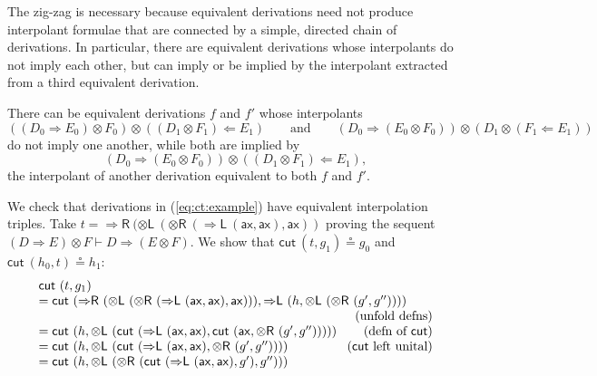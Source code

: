 \documentclass[a4paper,UKenglish,cleveref,autoref,thm-restate, anonymous]{lipics-v2021}
\newcommand{\ot}{\otimes}
\newcommand{\Larr}{\Leftarrow}
\newcommand{\Rarr}{\Rightarrow}
\newcommand{\mf}[1]{\mathsf{#1}}
\newcommand{\vd}{\vdash}
\newcommand{\ax}{\mathsf{ax}}
\newcommand{\tl}{{\otimes}\mathsf{L}}
\newcommand{\tr}{{\otimes}\mathsf{R}}
\newcommand{\Rl}{{\Rarr}\mathsf{L}}
\newcommand{\Rr}{{\Rarr}\mathsf{R}}
\newcommand{\cut}{\mf{cut}}
\begin{document}
The zig-zag is necessary because equivalent derivations need not produce interpolant formulae that are connected by a simple, directed chain of derivations. In particular, there are equivalent derivations whose interpolants do not imply each other, but can imply or be implied by the interpolant extracted from a third equivalent derivation.

There can be equivalent derivations $f$ and $f'$ whose interpolants
\[
((D_0 \Rarr E_0) \ot F_0) \ot ((D_1 \ot F_1) \Larr E_1)
\qquad\text{and}\qquad
(D_0 \Rarr (E_0 \ot F_0)) \ot (D_1 \ot (F_1 \Larr E_1))
\]
do not imply one another, while both are implied by
\[
(D_0 \Rarr (E_0 \ot F_0)) \ot ((D_1 \ot F_1) \Larr E_1),
\]
the interpolant of another derivation equivalent to both $f$ and $f'$.
\addtocounter{example}{-1}
\begin{example}[continued]\label{example}
We check that derivations in (\ref{eq:ct:example}) have equivalent interpolation triples.
Take $t = \Rr \ (\tl \ (\tr \ (\Rl \ (\ax , \ax),\ax))$ proving the sequent $(D \Rarr E) \ot F \vd D \Rarr (E \ot F)$.
We show that $\cut \ (t , g_1) \circeq g_0$ and $\cut \ (h_0 , t) \circeq h_1$:
\[
\begin{array}{lr}
  \cut \ (t,g_1) &
  \\
  = \cut \ (\Rr \ (\tl \ (\tr \ (\Rl \ (\ax , \ax) , \ax))), \Rl \ (h , \tl \ (\tr \ (g' , g'')))) &
    \\ & \hspace*{-2cm}\text{(unfold defns)}
    \\
    = \cut \ (h , \tl \ (\cut \ (\Rl \ (\ax , \ax), \cut \ (\ax , \tr \ (g' , g''))))) &
    \hspace*{-2cm}\text{(defn of $\cut$)}
    \\
    = \cut \ (h , \tl \ (\cut \ (\Rl \ (\ax , \ax), \tr \ (g' , g'')))) &
     \hspace*{-2cm}\text{($\cut$ left unital)}
    \\
    = \cut \ (h , \tl \ (\tr \ (\cut \ (\Rl \ (\ax , \ax) , g') , g''))) &

\end{array}\]
\end{example}
\end{document}

